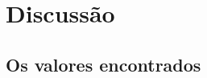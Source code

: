 \documentclass[14pt,twocolumn ]{article}
\begin{document}















\section{Discussão}

\subsection{Os valores encontrados}
\end{document}
